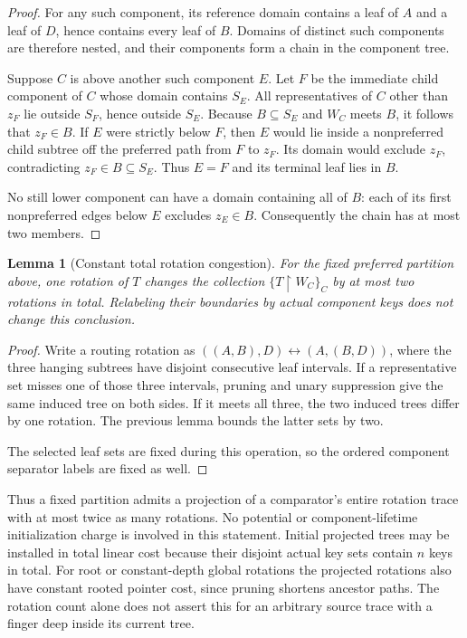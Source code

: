 \documentclass[11pt]{article}
\newtheorem{lemma}{Lemma}
\begin{document}
\begin{proof}
For any such component, its reference domain contains a leaf of $A$
and a leaf of $D$, hence contains every leaf of $B$. Domains of distinct
such components are therefore nested, and their components form a
chain in the component tree.

Suppose $C$ is above another such component $E$. Let $F$ be the
immediate child component of $C$ whose domain contains $S_E$. All
representatives of $C$ other than $z_F$ lie outside $S_F$, hence
outside $S_E$. Because $B\subseteq S_E$ and $W_C$ meets $B$, it follows
that $z_F\in B$. If $E$ were strictly below $F$, then $E$ would lie
inside a nonpreferred child subtree off the preferred path from $F$
to $z_F$. Its domain would exclude $z_F$, contradicting
$z_F\in B\subseteq S_E$. Thus $E=F$ and its terminal leaf lies in $B$.

No still lower component can have a domain containing all of $B$:
each of its first nonpreferred edges below $E$ excludes $z_E\in B$.
Consequently the chain has at most two members.
\end{proof}

\begin{lemma}[Constant total rotation congestion]
For the fixed preferred partition above, one rotation of $T$ changes
the collection $\{T\upharpoonright W_C\}_C$ by at most two rotations
in total. Relabeling their boundaries by actual component keys does
not change this conclusion.
\end{lemma}

\begin{proof}
Write a routing rotation as $((A,B),D)\leftrightarrow(A,(B,D))$,
where the three hanging subtrees have disjoint consecutive leaf
intervals. If a representative set misses one of those three intervals,
pruning and unary suppression give the same induced tree on both
sides. If it meets all three, the two induced trees differ by one
rotation. The previous lemma bounds the latter sets by two.

The selected leaf sets are fixed during this operation, so the ordered
component separator labels are fixed as well.
\end{proof}

Thus a fixed partition admits a projection of a comparator's entire
rotation trace with at most twice as many rotations. No potential or
component-lifetime initialization charge is involved in this statement.
Initial projected trees may be installed in total linear cost because
their disjoint actual key sets contain $n$ keys in total.
For root or constant-depth global rotations the projected rotations
also have constant rooted pointer cost, since pruning shortens ancestor
paths. The rotation count alone does not assert this for an arbitrary
source trace with a finger deep inside its current tree.
\end{document}
